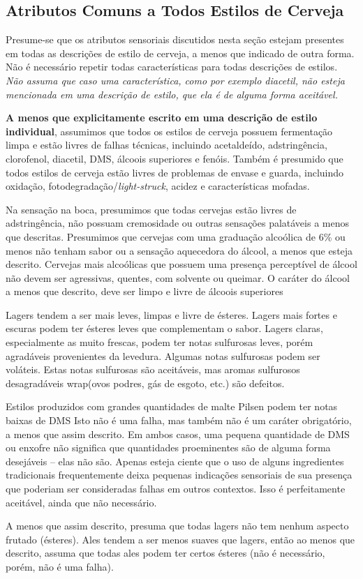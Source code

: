\subsection*{Atributos Comuns a Todos Estilos de Cerveja}

Presume-se que os atributos sensoriais discutidos nesta seção estejam presentes em todas as descrições de estilo de cerveja, a menos que indicado de outra forma. Não é necessário repetir todas características para todas descrições de estilos. \textit{Não assuma que caso uma característica, como por exemplo diacetil, não esteja mencionada em uma descrição de estilo, que ela é de alguma forma aceitável.}

\textbf{A menos que explicitamente escrito em uma descrição de estilo individual}, assumimos que todos os estilos de cerveja possuem fermentação limpa e estão livres de falhas técnicas, incluindo acetaldeído, adstringência, clorofenol, diacetil, DMS, álcoois superiores e fenóis. Também é presumido que todos estilos de cerveja estão livres de problemas de envase e guarda, incluindo oxidação, fotodegradação/\textit{light-struck}, acidez e características mofadas.

Na sensação na boca, presumimos que todas cervejas estão livres de adstringência, não possuam cremosidade ou outras sensações palatáveis a menos que descritas. Presumimos que cervejas com uma graduação alcoólica de 6\% ou menos não tenham sabor ou a sensação aquecedora do álcool, a menos que esteja descrito. Cervejas mais alcoólicas que possuem uma presença perceptível de álcool não devem ser agressivas, quentes, com solvente ou queimar. O caráter do álcool a menos que descrito, deve ser limpo e livre de álcoois superiores

Lagers tendem a ser mais leves, limpas e livre de ésteres.  Lagers mais fortes e escuras podem ter ésteres leves que complementam o sabor. Lagers claras, especialmente as muito frescas, podem ter notas sulfurosas leves, porém agradáveis provenientes da levedura. Algumas notas sulfurosas podem ser voláteis. Estas notas sulfurosas são aceitáveis, mas aromas sulfurosos desagradáveis wrap(ovos podres, gás de esgoto, etc.) são defeitos.

Estilos produzidos com grandes quantidades de malte Pilsen podem ter notas baixas de DMS Isto não é uma falha, mas também não é um caráter obrigatório, a menos que assim descrito. Em ambos casos, uma pequena quantidade de DMS ou enxofre não significa que quantidades proeminentes são de alguma forma desejáveis – elas não são. Apenas esteja ciente que o uso de alguns ingredientes tradicionais frequentemente deixa pequenas indicações sensoriais de sua presença que poderiam ser consideradas falhas em outros contextos. Isso é perfeitamente aceitável, ainda que não necessário.

A menos que assim descrito, presuma que todas lagers não tem nenhum aspecto frutado (ésteres). Ales tendem a ser menos suaves que lagers, então ao menos que descrito, assuma que todas ales podem ter certos ésteres (não é necessário, porém, não é uma falha).
